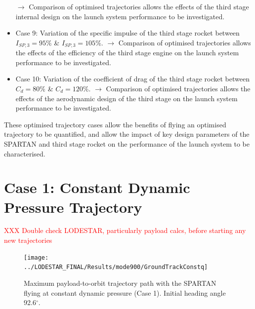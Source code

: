 \begin{itemize}
	\newline$\rightarrow$ Comparison of optimised trajectories allows the effects of the third stage internal design on the launch system performance to be investigated. 
	\item Case 9: Variation of the specific impulse of the third stage rocket between $I_{SP,3} = 95\%$ \& $I_{SP,3} = 105\%$. 
	\newline$\rightarrow$ Comparison of optimised trajectories allows the effects of the efficiency of the third stage engine on the launch system performance to be investigated. 
	\item Case 10: Variation of the coefficient of drag of the third stage rocket between $C_d = 80\%$ \& $C_d = 120\%$.
	\newline$\rightarrow$ Comparison of optimised trajectories allows the effects of the aerodynamic design of the third stage on the launch system performance to be investigated.
\end{itemize}
These optimised trajectory cases allow the benefits of flying an optimised trajectory to be quantified, and allow the impact of key design parameters of the SPARTAN and third stage rocket on the performance of the launch system to be characterised. 
  

\section{Case 1: Constant Dynamic Pressure Trajectory}
\textcolor{red}{XXX Double check LODESTAR, particularly payload calcs, before starting any new trajectories}

\begin{figure}[ht]
	\centering
	\texttt{[image: ../LODESTAR\_FINAL/Results/mode900/GroundTrackConstq]}
	\caption{Maximum payload-to-orbit trajectory path with the SPARTAN flying at constant dynamic pressure (Case 1). Initial heading angle 92.6$^\circ$.}
	\label{fig:GroundTrackConstq}
\end{figure}

